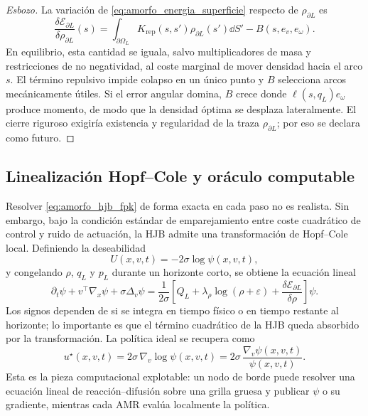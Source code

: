 \begin{proof}[Esbozo]
La variación de \eqref{eq:amorfo_energia_superficie} respecto de
$\rho_{\partial L}$ es
\[
  \frac{\delta\mathcal E_{\partial L}}{\delta\rho_{\partial L}}(s)
  =
  \int_{\partial\Omega_L}K_{\mathrm{rep}}(s,s')\rho_{\partial L}(s')\dd S'
  -
  B(s,e_v,e_\omega).
\]
En equilibrio, esta cantidad se iguala, salvo multiplicadores de masa y restricciones de
no negatividad, al coste marginal de mover densidad hacia el arco $s$. El término
repulsivo impide colapso en un único punto y $B$ selecciona arcos mecánicamente útiles.
Si el error angular domina, $B$ crece donde $\ell(s,q_L)e_\omega$ produce momento, de
modo que la densidad óptima se desplaza lateralmente. El cierre riguroso exigiría
existencia y regularidad de la traza $\rho_{\partial L}$; por eso se declara como futuro.
\end{proof}

\subsection{Linealización Hopf--Cole y oráculo computable}
\label{subsec:amorfo-hopf-cole}

Resolver \eqref{eq:amorfo_hjb_fpk} de forma exacta en cada paso no es realista. Sin
embargo, bajo la condición estándar de emparejamiento entre coste cuadrático de control y
ruido de actuación, la HJB admite una transformación de Hopf--Cole local. Definiendo la
deseabilidad
\begin{equation}
  U(x,v,t)=-2\sigma\log\psi(x,v,t),
  \label{eq:amorfo_hopf_cole}
\end{equation}
y congelando $\rho$, $q_L$ y $p_L$ durante un horizonte corto, se obtiene la ecuación
lineal
\begin{equation}
  \partial_t\psi
  +v^\top\nabla_x\psi
  +\sigma\Delta_v\psi
  =
  \frac{1}{2\sigma}
  \left[
    Q_L
    +\lambda_\rho\log(\rho+\varepsilon)
    +\frac{\delta\mathcal E_{\partial L}}{\delta\rho}
  \right]\psi .
  \label{eq:amorfo_heat}
\end{equation}
Los signos dependen de si se integra en tiempo físico o en tiempo restante al horizonte;
lo importante es que el término cuadrático de la HJB queda absorbido por la
transformación. La política ideal se recupera como
\begin{equation}
  u^\star(x,v,t)
  =
  2\sigma\,\nabla_v\log\psi(x,v,t)
  =
  2\sigma\,\frac{\nabla_v\psi(x,v,t)}{\psi(x,v,t)} .
  \label{eq:amorfo_politica_hopf}
\end{equation}
Esta es la pieza computacional explotable: un nodo de borde puede resolver una ecuación
lineal de reacción--difusión sobre una grilla gruesa y publicar $\psi$ o su gradiente,
mientras cada AMR evalúa localmente la política.

